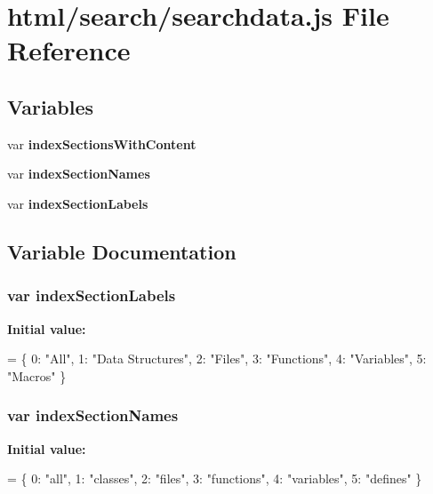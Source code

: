 \section{html/search/searchdata.js File Reference}
\label{searchdata_8js}
\subsection*{Variables}
\begin{DoxyCompactItemize}
\item 
var {\bf index\+Sections\+With\+Content}
\item 
var {\bf index\+Section\+Names}
\item 
var {\bf index\+Section\+Labels}
\end{DoxyCompactItemize}


\subsection{Variable Documentation}
\subsubsection[{index\+Section\+Labels}]{\setlength{\rightskip}{0pt plus 5cm}var index\+Section\+Labels}\label{searchdata_8js_a529972e449c82dc118cbbd3bcf50c44d}
{\bfseries Initial value\+:}
\begin{DoxyCode}
=
\{
  0: \textcolor{stringliteral}{"All"},
  1: \textcolor{stringliteral}{"Data Structures"},
  2: \textcolor{stringliteral}{"Files"},
  3: \textcolor{stringliteral}{"Functions"},
  4: \textcolor{stringliteral}{"Variables"},
  5: \textcolor{stringliteral}{"Macros"}
\}
\end{DoxyCode}
\subsubsection[{index\+Section\+Names}]{\setlength{\rightskip}{0pt plus 5cm}var index\+Section\+Names}\label{searchdata_8js_a77149ceed055c6c6ce40973b5bdc19ad}
{\bfseries Initial value\+:}
\begin{DoxyCode}
=
\{
  0: \textcolor{stringliteral}{"all"},
  1: \textcolor{stringliteral}{"classes"},
  2: \textcolor{stringliteral}{"files"},
  3: \textcolor{stringliteral}{"functions"},
  4: \textcolor{stringliteral}{"variables"},
  5: \textcolor{stringliteral}{"defines"}
\}
\end{DoxyCode}
